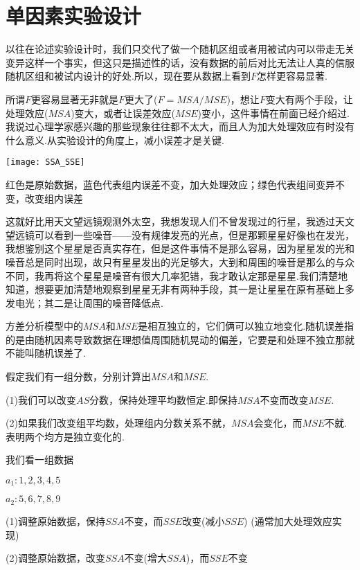 \setchapterpreamble[u]{\margintoc}
\chapter{单因素实验设计}

以往在论述实验设计时，我们只交代了做一个随机区组或者用被试内可以带走无关变异这样一个事实，但这只是描述性的话，没有数据的前后对比无法让人真的信服随机区组和被试内设计的好处.所以，现在要从数据上看到$F$怎样更容易显著.

所谓$F$更容易显著无非就是$F$更大了($F=MSA/MSE$)，想让$F$变大有两个手段，让处理效应($MSA$)变大，或者让误差效应($MSE$)变小，这件事情在前面已经介绍过.我说过心理学家感兴趣的那些现象往往都不太大，而且人为加大处理效应有时没有什么意义.从实验设计的角度上，减小误差才是关键.

\begin{marginfigure}
	\texttt{[image: SSA\_SSE]}
	\caption{红色是原始数据，蓝色代表组内误差不变，加大处理效应；绿色代表组间变异不变，改变组内误差}
\end{marginfigure}

这就好比用天文望远镜观测外太空，我想发现人们不曾发现过的行星，我透过天文望远镜可以看到一些噪音——没有规律发亮的光点，但是那颗星星好像也在发光，我想鉴别这个星星是否真实存在，但是这件事情不是那么容易，因为星星发的光和噪音总是同时出现，故只有星星发出的光足够大，大到和周围的噪音是那么的与众不同，我再将这个星星是噪音有很大几率犯错，我才敢认定那是星星.我们清楚地知道，想要更加清楚地观察到星星无非有两种手段，其一是让星星在原有基础上多发电光；其二是让周围的噪音降低点.

方差分析模型中的$MSA$和$MSE$是相互独立的，它们俩可以独立地变化.随机误差指的是由随机因素导致数据在理想值周围随机晃动的偏差，它要是和处理不独立那就不能叫随机误差了.

\begin{kaobox}[frametitle=思考]
假定我们有一组分数，分别计算出$MSA$和$MSE$.

(1)我们可以改变$AS$分数，保持处理平均数恒定.即保持$MSA$不变而改变$MSE$.

(2)如果我们改变组平均数，处理组内分数关系不就，$MSA$会变化，而$MSE$不就.表明两个均方是独立变化的.

我们看一组数据

$a_1:1, 2, 3, 4, 5$

$a_2:5, 6, 7, 8, 9$

(1)调整原始数据，保持$SSA$不变，而$SSE$改变(减小$SSE$) (通常加大处理效应实现)

(2)调整原始数据，改变$SSA$不变(增大$SSA$)，而$SSE$不变
\end{kaobox}




